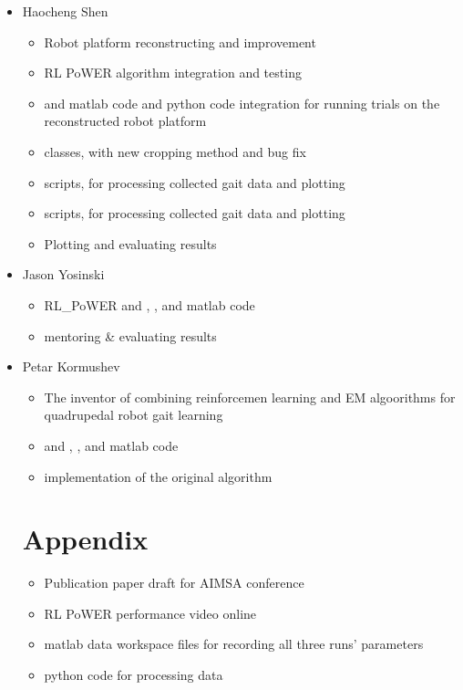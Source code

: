 \begin{itemize}
\item Haocheng Shen
\begin{itemize}
\item Robot platform reconstructing and improvement
\item RL PoWER algorithm integration and testing
\item {} and  matlab code and python code integration for running trials on the reconstructed robot platform
\item {} classes, with new cropping method and bug fix
\item {} scripts, for processing collected gait data and plotting
\item {} scripts, for processing collected gait data and plotting
\item Plotting and evaluating results
\end{itemize}

\item Jason Yosinski
\begin{itemize}
\item {RL\_PoWER} and  , , and  matlab code
\item mentoring \& evaluating results
\end{itemize}

\item Petar Kormushev
\begin{itemize}
\item The inventor of combining reinforcemen learning and EM algoorithms for quadrupedal robot gait learning
\item {} and  , , and  matlab code
\item implementation of the original algorithm
\end{itemize}


\section{Appendix}
\begin{itemize}
\item Publication paper draft for AIMSA conference
\item RL PoWER performance video online 
\item matlab data workspace files for recording all three runs' parameters
\item python code for processing data
\end{itemize}
\end{itemize}


